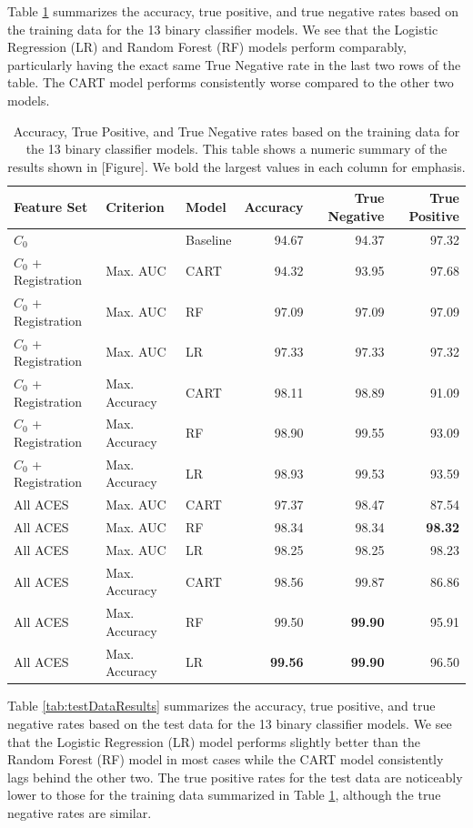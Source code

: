 \documentclass[11pt,]{isuthesis}
\begin{document}
Table \ref{tab:trainDataResults} summarizes the accuracy, true positive, and true negative rates based on the training data for the 13 binary classifier models.
We see that the Logistic Regression (LR) and Random Forest (RF) models perform comparably, particularly having the exact same True Negative rate in the last two rows of the table.
The CART model performs consistently worse compared to the other two models.

\begin{table}

\caption{\label{tab:trainDataResults}Accuracy, True Positive, and True Negative rates based on the training data for the 13 binary classifier models. This table shows a numeric summary of the results shown in [Figure]. We bold the largest values in each column for emphasis.}
\centering
\begin{tabular}[t]{lllrrr}
\toprule
Feature Set & Criterion & Model & Accuracy & True Negative & True Positive\\
\midrule
$C_0$ &  & Baseline & 94.67 & 94.37 & 97.32\\
\addlinespace
$C_0$ + Registration & Max. AUC & CART & 94.32 & 93.95 & 97.68\\
$C_0$ + Registration & Max. AUC & RF & 97.09 & 97.09 & 97.09\\
$C_0$ + Registration & Max. AUC & LR & 97.33 & 97.33 & 97.32\\
\addlinespace
$C_0$ + Registration & Max. Accuracy & CART & 98.11 & 98.89 & 91.09\\
$C_0$ + Registration & Max. Accuracy & RF & 98.90 & 99.55 & 93.09\\
$C_0$ + Registration & Max. Accuracy & LR & 98.93 & 99.53 & 93.59\\
\addlinespace
All ACES & Max. AUC & CART & 97.37 & 98.47 & 87.54\\
All ACES & Max. AUC & RF & 98.34 & 98.34 & \textbf{98.32}\\
All ACES & Max. AUC & LR & 98.25 & 98.25 & 98.23\\
\addlinespace
All ACES & Max. Accuracy & CART & 98.56 & 99.87 & 86.86\\
All ACES & Max. Accuracy & RF & 99.50 & \textbf{99.90} & 95.91\\
All ACES & Max. Accuracy & LR & \textbf{99.56} & \textbf{99.90} & 96.50\\
\bottomrule
\end{tabular}
\end{table}

Table \ref{tab:testDataResults} summarizes the accuracy, true positive, and true negative rates based on the test data for the 13 binary classifier models.
We see that the Logistic Regression (LR) model performs slightly better than the Random Forest (RF) model in most cases while the CART model consistently lags behind the other two.
The true positive rates for the test data are noticeably lower to those for the training data summarized in Table \ref{tab:trainDataResults}, although the true negative rates are similar.
\end{document}
